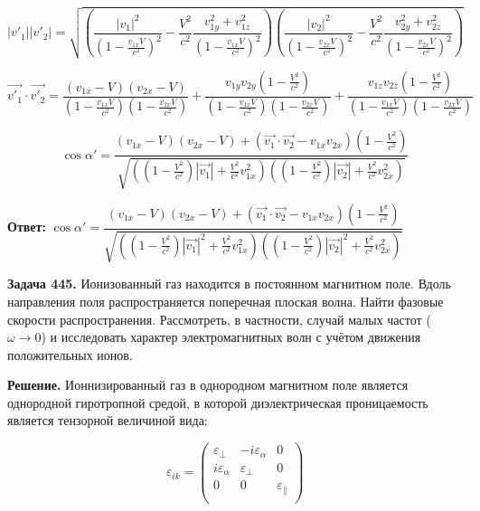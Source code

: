 \documentclass[a4paper,12pt]{article}
\begin{document}
	\begin{equation}
		|v'_1||v'_2| = \sqrt{\left(\dfrac{|v_1|^2}{\left(1 - \frac{v_{1x} V}{c^2}\right)^2} - \dfrac{V^2}{c^2} \dfrac{v_{1y}^2  + v_{1z}^2}{\left(1 - \frac{v_{1x} V}{c^2}\right)^2}\right)\left(\dfrac{|v_2|^2}{\left(1 - \frac{v_{2x} V}{c^2}\right)^2} - \dfrac{V^2}{c^2} \dfrac{v_{2y}^2  + v_{2z}^2}{\left(1 - \frac{v_{2x} V}{c^2}\right)^2}\right)}
	\end{equation}
	
	\begin{equation}
		\vec{v'_1} \cdot \vec{v'_2}  = \dfrac{(v_{1x} - V)(v_{2x} - V)}{\left(1 - \frac{v_{1x} V}{c^2}\right)\left(1 - \frac{v_{2x} V}{c^2}\right)} + \dfrac{v_{1y} v_{2y} \left(1 - \frac{V^2}{c^2}\right)}{\left(1 - \frac{v_{1x} V}{c^2}\right)\left(1 - \frac{v_{2x} V}{c^2}\right)} + \dfrac{v_{1z} v_{2z} \left(1 - \frac{V^2}{c^2}\right)}{\left(1 - \frac{v_{1x} V}{c^2}\right)\left(1 - \frac{v_{2x} V}{c^2}\right)}
	\end{equation}
	
	\begin{equation}
		\cos\alpha' = \dfrac{(v_{1x} - V)(v_{2x} - V) + \left(\vec{v_1}\cdot\vec{v_2} - v_{1x}v_{2x}\right) \left(1-\frac{V^2}{c^2}\right) }{\sqrt{\left(\left(1-\frac{V^2}{c^2}\right)|\vec{v_1}| + \frac{V^2}{c^2} v_{1x}^2 \right)\left(\left(1-\frac{V^2}{c^2}\right)|\vec{v_2}| + \frac{V^2}{c^2} v_{2x}^2 \right)}}
	\end{equation}
	
	\quad \textbf{Ответ:} $\cos\alpha' = \dfrac{(v_{1x} - V)(v_{2x} - V) + \left(\vec{v_1}\cdot\vec{v_2} - v_{1x}v_{2x}\right) \left(1-\frac{V^2}{c^2}\right) }{\sqrt{\left(\left(1-\frac{V^2}{c^2}\right)|\vec{v_1}|^2 + \frac{V^2}{c^2} v_{1x}^2 \right)\left(\left(1-\frac{V^2}{c^2}\right)|\vec{v_2}|^2 + \frac{V^2}{c^2} v_{2x}^2 \right)}}$
	
	\quad \textbf{Задача 445.} Ионизованный газ находится в постоянном магнитном поле. Вдоль направления поля распространяется поперечная плоская волна. Найти фазовые скорости распространения. Рассмотреть, в частности, случай малых частот ($\omega \to 0$) и исследовать характер электромагнитных волн с учётом движения положительных ионов.
	
	\quad \textbf{Решение.} Ионнизированный газ в однородном магнитном поле является однородной гиротропной средой, в которой диэлектрическая проницаемость является тензорной величиной вида:
	
	\begin{equation}
		\varepsilon_{ik} = \left(\begin{array}{ccc}
			\varepsilon_{\perp} & -i\varepsilon_{\alpha} & 0 \\
			i\varepsilon_{\alpha} & \varepsilon_{\perp} & 0 \\
			0 & 0 & \varepsilon_{\parallel} \\ 
		\end{array}\right)
	\end{equation}
	
\end{document}
